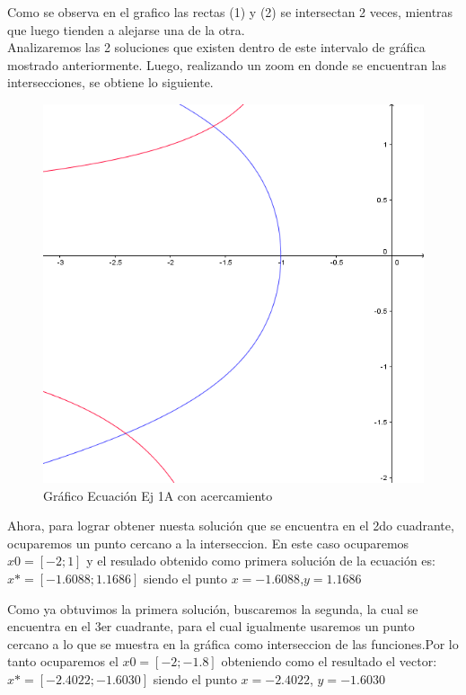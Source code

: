 \documentclass{udpreport}
\begin{document}
\begin{enumerate}
            Como se observa en el grafico las rectas (1) y (2) se intersectan 2 veces, mientras que luego tienden a alejarse una de la otra. \\Analizaremos las 2 soluciones que existen dentro de este intervalo de gráfica mostrado anteriormente. Luego, realizando un zoom en donde se encuentran las intersecciones, se obtiene lo siguiente.\\
            
            \begin{figure}[H]
               \centering   \includegraphics[width=13cm]{GraficoEcEj1azoom}
                \caption{Gráfico Ecuación Ej 1A con acercamiento}
            \end{figure}
            Ahora, para lograr obtener nuesta solución que se encuentra en el 2do cuadrante, ocuparemos un punto cercano a la interseccion. En este caso ocuparemos $ x0=[-2;1] $ y el resulado obtenido como primera solución de la ecuación es:
            $ x*=[-1.6088;1.1686 ]$ siendo el punto  $x = -1.6088$,$y = 1.1686$
            
            Como ya obtuvimos la primera solución, buscaremos la segunda, la cual se encuentra en el 3er cuadrante, para el cual igualmente usaremos un punto cercano a lo que se muestra en la gráfica como interseccion de las funciones.Por lo tanto ocuparemos el $x0=[-2;-1.8] $ obteniendo como el resultado el vector:
            $x*=[-2.4022;-1.6030]$ siendo el punto $x=-2.4022$, $y=-1.6030$


\end{enumerate}
\end{document}
